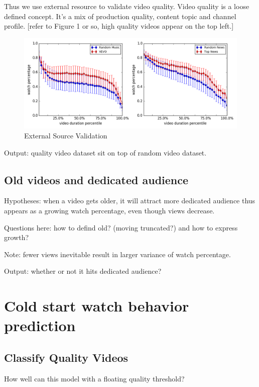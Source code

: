 \documentclass[letterpaper]{article}
\begin{document}
Thus we use external resource to validate video quality. Video quality is a loose defined concept. It's a mix of production quality, content topic and channel profile. [refer to Figure 1 or so, high quality videos appear on the top left.]

\begin{figure}
    \centering
    \includegraphics[scale=0.32]{external_source_comp.png}
    \caption{External Source Validation}
\end{figure}

Output: quality video dataset sit on top of random video dataset.


\subsection{Old videos and dedicated audience}

Hypotheses: when a video gets older, it will attract more dedicated audience thus appears as a growing watch percentage, even though views decrease.

Questions here: how to defind old? (moving truncated?) and how to express growth?

Note: fewer views inevitable result in larger variance of watch percentage.

Output: whether or not it hits dedicated audience?



\section{Cold start watch behavior prediction}

\subsection{Classify Quality Videos}
How well can this model with a floating quality threshold?
\end{document}
